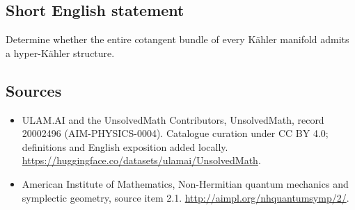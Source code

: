 \documentclass[11pt]{article}
\begin{document}
\subsection{Short English statement}
Determine whether the entire cotangent bundle of every Kähler manifold admits a hyper-Kähler structure.
\subsection{Sources}
\begin{itemize}
\item[\hypertarget{source:20002496:1}{S1}] ULAM.AI and the UnsolvedMath Contributors, UnsolvedMath, record 20002496 (AIM-PHYSICS-0004). Catalogue curation under CC BY 4.0; definitions and English exposition added locally.
\url{https://huggingface.co/datasets/ulamai/UnsolvedMath}.
\item[\hypertarget{source:20002496:2}{S2}] American Institute of Mathematics, Non-Hermitian quantum mechanics and symplectic geometry, source item 2.1.
\url{http://aimpl.org/nhquantumsymp/2/}.
\end{itemize}
\label{end:20002496}
\end{document}
